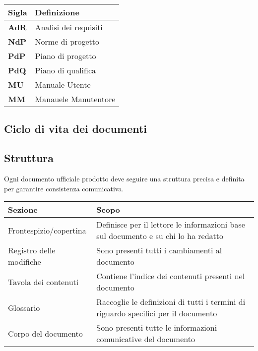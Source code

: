 \begin{center}
    \begin{tabularx}{\linewidth}{l | X }            
        \textbf{Sigla} & \textbf{Definizione}\\
        \hline
        \textbf{AdR} & Analisi dei requisiti\\
        \textbf{NdP}& Norme di progetto\\
        \textbf{PdP}& Piano di progetto\\
        \textbf{PdQ}& Piano di qualifica\\
        \textbf{MU}& Manuale Utente\\
        \textbf{MM}& Manauele Manutentore\\
    \end{tabularx}
\end{center}

\subsection{Ciclo di vita dei documenti}

\subsection{Struttura}

Ogni documento ufficiale prodotto deve seguire una struttura precisa e definita per garantire consistenza comunicativa.

\begin{center}
    \begin{tabularx}{\linewidth}{l | X }            
        \textbf{Sezione} & \textbf{Scopo}\\
        \hline
        Frontespizio/copertina & Definisce per il lettore le informazioni base sul documento e su chi lo ha redatto\\
        Registro delle modifiche & Sono presenti tutti i cambiamenti al documento\\
        Tavola dei contenuti & Contiene l'indice dei contenuti presenti nel documento \\
        Glossario & Raccoglie le definizioni di tutti i termini di riguardo specifici per il documento\\
        Corpo del documento & Sono presenti tutte le informazioni comunicative del documento\\
    \end{tabularx}
\end{center}

